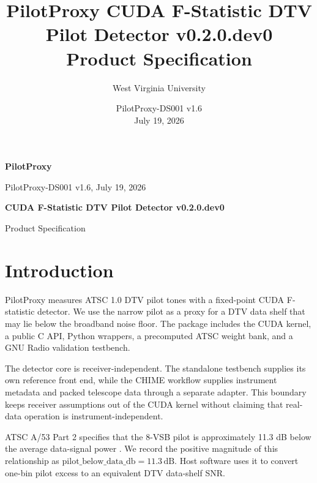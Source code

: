 \documentclass[10pt,letterpaper]{article}
\title{PilotProxy CUDA F-Statistic DTV Pilot Detector v0.2.0.dev0\\Product Specification}
\author{West Virginia University}
\date{PilotProxy-DS001 v1.6 \\ July 19, 2026}
\newcommand{\dB}{\,\mathrm{dB}}
\begin{document}
\thispagestyle{fancy}
{\sffamily
\begin{minipage}[t]{0.39\textwidth}
  {\fontsize{24}{26}\selectfont\bfseries\color{FStatRed}PilotProxy}\par
  {\small PilotProxy-DS001 v1.6, July 19, 2026}
\end{minipage}
\hfill
\begin{minipage}[t]{0.58\textwidth}
  \raggedleft
  {\fontsize{18}{20}\selectfont\bfseries CUDA F-Statistic DTV Pilot Detector v0.2.0.dev0}\par
  {\small Product Specification}
\end{minipage}
}

\vspace{0.14in}

\begin{minipage}[t]{0.48\textwidth}
\section*{Introduction}
PilotProxy measures ATSC 1.0 DTV pilot tones with a fixed-point CUDA F-statistic detector. We use the narrow pilot as a proxy for a DTV data shelf that may lie below the broadband noise floor. The package includes the CUDA kernel, a public C API, Python wrappers, a precomputed ATSC weight bank, and a GNU Radio validation testbench.

The detector core is receiver-independent. The standalone testbench supplies its own reference front end, while the CHIME workflow supplies instrument metadata and packed telescope data through a separate adapter. This boundary keeps receiver assumptions out of the CUDA kernel without claiming that real-data operation is instrument-independent.

ATSC A/53 Part 2 specifies that the 8-VSB pilot is approximately 11.3 dB below the average data-signal power \cite{atsc_a53_part2_2011}. We record the positive magnitude of this relationship as \(\mathrm{pilot\_below\_data\_db}=11.3\dB\). Host software uses it to convert one-bin pilot excess to an equivalent DTV data-shelf SNR.


\end{minipage}
\end{document}
